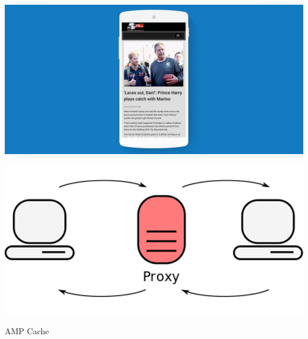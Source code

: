 \documentclass[graphic, aspectratio=169]{beamer}
\begin{document}
{\includegraphics[width=\paperwidth,height=\paperheight]{images/amp_example.jpg}}
\begin{frame}
\end{frame}

{\includegraphics[width=\paperwidth,height=\paperheight]{images/proxy.png}}
\begin{frame}{AMP Cache}
\end{frame}
\end{document}
